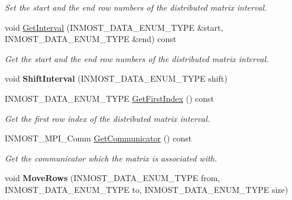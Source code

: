 \begin{DoxyCompactItemize}
\begin{DoxyCompactList}\small\item\em Set the start and the end row numbers of the distributed matrix interval. \end{DoxyCompactList}\item 
\hypertarget{classINMOST_1_1Solver_1_1Matrix_aa430f9610b22450369d7919be9bc32be}{void \hyperlink{classINMOST_1_1Solver_1_1Matrix_aa430f9610b22450369d7919be9bc32be}{Get\-Interval} (I\-N\-M\-O\-S\-T\-\_\-\-D\-A\-T\-A\-\_\-\-E\-N\-U\-M\-\_\-\-T\-Y\-P\-E \&start, I\-N\-M\-O\-S\-T\-\_\-\-D\-A\-T\-A\-\_\-\-E\-N\-U\-M\-\_\-\-T\-Y\-P\-E \&end) const }\label{classINMOST_1_1Solver_1_1Matrix_aa430f9610b22450369d7919be9bc32be}

\begin{DoxyCompactList}\small\item\em Get the start and the end row numbers of the distributed matrix interval. \end{DoxyCompactList}\item 
\hypertarget{classINMOST_1_1Solver_1_1Matrix_a732950bdbc154caec4a92788ce0b0ddf}{void {\bfseries Shift\-Interval} (I\-N\-M\-O\-S\-T\-\_\-\-D\-A\-T\-A\-\_\-\-E\-N\-U\-M\-\_\-\-T\-Y\-P\-E shift)}\label{classINMOST_1_1Solver_1_1Matrix_a732950bdbc154caec4a92788ce0b0ddf}

\item 
\hypertarget{classINMOST_1_1Solver_1_1Matrix_a98f1fc86cfcf33f3fec650ee2fedb2d6}{I\-N\-M\-O\-S\-T\-\_\-\-D\-A\-T\-A\-\_\-\-E\-N\-U\-M\-\_\-\-T\-Y\-P\-E \hyperlink{classINMOST_1_1Solver_1_1Matrix_a98f1fc86cfcf33f3fec650ee2fedb2d6}{Get\-First\-Index} () const }\label{classINMOST_1_1Solver_1_1Matrix_a98f1fc86cfcf33f3fec650ee2fedb2d6}

\begin{DoxyCompactList}\small\item\em Get the first row index of the distributed matrix interval. \end{DoxyCompactList}\item 
\hypertarget{classINMOST_1_1Solver_1_1Matrix_a02938588dedf017205feceef352c30b7}{I\-N\-M\-O\-S\-T\-\_\-\-M\-P\-I\-\_\-\-Comm \hyperlink{classINMOST_1_1Solver_1_1Matrix_a02938588dedf017205feceef352c30b7}{Get\-Communicator} () const }\label{classINMOST_1_1Solver_1_1Matrix_a02938588dedf017205feceef352c30b7}

\begin{DoxyCompactList}\small\item\em Get the communicator which the matrix is associated with. \end{DoxyCompactList}\item 
\hypertarget{classINMOST_1_1Solver_1_1Matrix_a44e323b551b116db6af55b177b405c71}{void {\bfseries Move\-Rows} (I\-N\-M\-O\-S\-T\-\_\-\-D\-A\-T\-A\-\_\-\-E\-N\-U\-M\-\_\-\-T\-Y\-P\-E from, I\-N\-M\-O\-S\-T\-\_\-\-D\-A\-T\-A\-\_\-\-E\-N\-U\-M\-\_\-\-T\-Y\-P\-E to, I\-N\-M\-O\-S\-T\-\_\-\-D\-A\-T\-A\-\_\-\-E\-N\-U\-M\-\_\-\-T\-Y\-P\-E size)}\label{classINMOST_1_1Solver_1_1Matrix_a44e323b551b116db6af55b177b405c71}


\end{DoxyCompactItemize}
